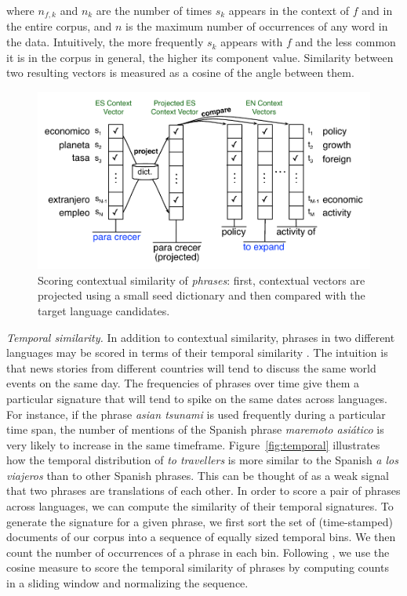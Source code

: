 \documentclass[11pt]{article}
\newcommand{\mtodo}[1]{}
\newcommand{\figref}[1]{Figure~\ref{#1}}
\newcommand{\paraheader}[1]{\vskip 0.05in \noindent\emph{#1}}
\begin{document}
\noindent where $n_{f,k}$ and $n_{k}$ are the number of times $s_{k}$ appears in the context of $f$ and in the entire corpus, and $n$ is the maximum number of occurrences of any word in the data.  Intuitively, the more frequently $s_{k}$ appears with $f$ and the less common it is in the corpus in general, the higher its component value.  Similarity between two resulting vectors is measured as a cosine of the angle between them.

\begin{figure}[t]
\includegraphics[width=\linewidth]{../figures/contextual/contextual}
\caption{Scoring contextual similarity of \emph{phrases}: first, contextual vectors are projected using a small seed dictionary and then compared with the target language candidates.}
\label{fig:contextual}
\end{figure}


\paraheader{Temporal similarity.} In addition to contextual similarity, phrases in two different languages may be scored in terms of their temporal similarity \cite{alfonseca-ciaramita-hall:2009:EMNLP}.  The intuition is that news stories from different countries will tend to discuss the same world events on the same day.  The frequencies of phrases over time give them a particular signature that will tend to spike on the same dates across languages.  For instance, if the phrase {\it asian tsunami} is used frequently during a particular time span, the number of mentions of the Spanish phrase {\it maremoto asi\'{a}tico} is very likely to increase in the same timeframe. \figref{fig:temporal} illustrates how the temporal distribution of {\it to travellers} is more similar to the Spanish {\it a los viajeros} than to other Spanish phrases.  This can be thought of as a weak signal that two phrases are translations of each other.  In order to score a pair of phrases across languages, we can compute the similarity of their temporal signatures. To generate the signature for a given phrase, we first sort the set of (time-stamped) documents of our corpus into a sequence of equally sized temporal bins.  We then count the number of occurrences of a phrase in each bin.  Following , we use the cosine measure to score the temporal similarity of phrases by computing counts in a sliding window and normalizing the sequence.
\end{document}
